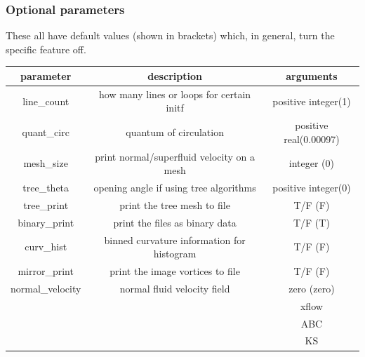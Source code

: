 \documentclass[12pt]{article}
\begin{document}
\subsubsection{Optional parameters}
These all have default values (shown in brackets) which, in general, turn the specific feature off.
\begin{flushleft}
\begin{tabular}{|c|c|c|}
    \hline
parameter & description & arguments\\
    \hline
line\_count & how many lines or loops for certain initf & positive integer(1)\\
quant\_circ & quantum of circulation & positive real(0.00097)\\
mesh\_size & print normal/superfluid velocity on a mesh& integer (0) \\
tree\_theta & opening angle if using tree algorithms & positive integer(0)\\
tree\_print & print the tree mesh to file & T/F (F)\\
binary\_print & print the files as binary data & T/F (T) \\
curv\_hist & binned curvature information for histogram & T/F (F) \\
mirror\_print & print the image vortices to file & T/F (F)\\
normal\_velocity & normal fluid velocity field & zero (zero) \\
                 &                           & xflow \\
                 &                           & ABC \\
                 &                           & KS \\


\end{tabular}
\end{flushleft}
\end{document}
